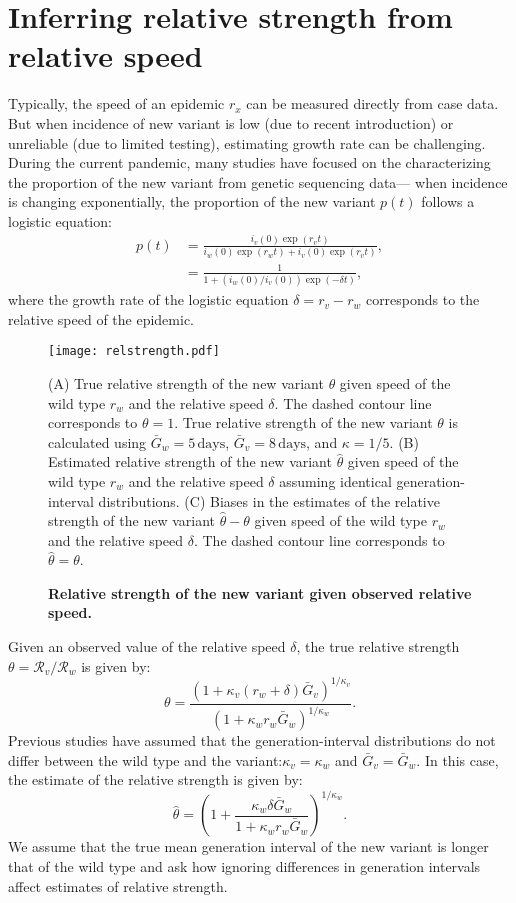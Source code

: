 \documentclass[12pt]{article}
\newcommand{\RR}{\ensuremath{{\mathcal R}}\xspace}
\begin{document}
\section{Inferring relative strength from relative speed}

Typically, the speed of an epidemic $r_x$ can be measured directly from case data.
But when incidence of new variant is low (due to recent introduction) or unreliable (due to limited testing), estimating growth rate can be challenging.
During the current pandemic, many studies have focused on the characterizing the proportion of the new variant from genetic sequencing data---
when incidence is changing exponentially, the proportion of the new variant $p(t)$ follows a logistic equation:
\begin{align}
p(t) &= \frac{i_v(0) \exp(r_v t)}{i_w(0) \exp(r_w t) + i_v(0) \exp(r_v t)},\\
&= \frac{1}{1 + \left(i_w(0)/i_v(0)\right) \exp(-\delta t)},
\end{align}
where the growth rate of the logistic equation $\delta = r_v - r_w$ corresponds to the relative speed of the epidemic.

\begin{figure}[!th]
\texttt{[image: relstrength.pdf]}
\caption{
\textbf{Relative strength of the new variant given observed relative speed.}
}
(A) True relative strength of the new variant $\theta$ given speed of the wild type $r_w$ and the relative speed $\delta$.
The dashed contour line corresponds to $\theta = 1$.
True relative strength of the new variant $\theta$ is calculated using $\bar{G}_w = 5\,\textrm{days}$, $\bar{G}_v = 8\,\textrm{days}$, and $\kappa = 1/5$. 
(B) Estimated relative strength of the new variant $\hat{\theta}$ given speed of the wild type
$r_w$ and the relative speed $\delta$ assuming identical generation-interval distributions.
(C) Biases in the estimates of the relative strength of the new variant $\hat{\theta} - \theta$ given speed of the wild type $r_w$ and the relative speed $\delta$.
The dashed contour line corresponds to $\hat{\theta} = \theta$.
\label{fig:relstrength}
\end{figure}

Given an observed value of the relative speed $\delta$, the true relative strength $\theta = \RR_v/\RR_w$ is given by:
\begin{equation}
\theta = \frac{(1 + \kappa_v (r_w + \delta) \bar{G}_v)^{1/\kappa_v}}{(1 + \kappa_w r_w \bar{G}_w)^{1/\kappa_w}}.
\end{equation}
Previous studies have assumed that the generation-interval distributions do not differ between the wild type and the variant:$\kappa_v = \kappa_w$ and $\bar{G}_v = \bar{G}_w$.
In this case, the estimate of the relative strength is given by:
\begin{equation}
\hat{\theta} = \left(1 + \frac{\kappa_w \delta \bar{G}_w}{1 + \kappa_w r_w \bar{G}_w}\right)^{1/\kappa_w}.
\end{equation}
We assume that the true mean generation interval of the new variant is longer that of the wild type and ask how ignoring differences in generation intervals affect estimates of relative strength.
\end{document}
